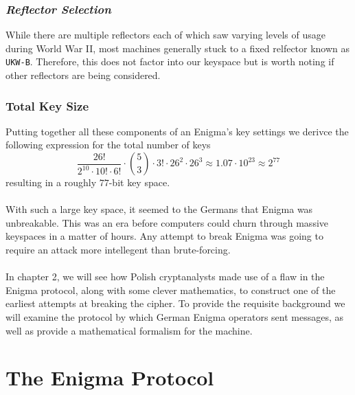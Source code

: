 \subsubsection{\emph{Reflector Selection}}
While there are multiple reflectors each of which saw varying levels of usage during World War II, most machines generally stuck to a fixed relfector known as \texttt{UKW-B}. Therefore, this does not factor into our keyspace but is worth noting if other reflectors are being considered.

\subsubsection{Total Key Size}
Putting together all these components of an Enigma's key settings we derivce the following expression for the total number of keys
\[
	\frac{26!}{2^10\cdot 10! \cdot 6!}\cdot{5\choose 3}\cdot3!\cdot 26^2\cdot 26^3 \approx 1.07 \cdot 10^{23} \approx 2^{77}
\]
resulting in a roughly $77$-bit key space.
\\\\With such a large key space, it seemed to the Germans that Enigma was unbreakable. This was an era before computers could churn through massive keyspaces in a matter of hours. Any attempt to break Enigma was going to require an attack more intellegent than brute-forcing.
\\\\In chapter 2, we will see how Polish cryptanalysts made use of a flaw in the Enigma protocol, along with some clever mathematics, to construct one of the earliest attempts at breaking the cipher. To provide the requisite background we will examine the protocol by which German Enigma operators sent messages, as well as provide a mathematical formalism for the machine.

\section{The Enigma Protocol}

